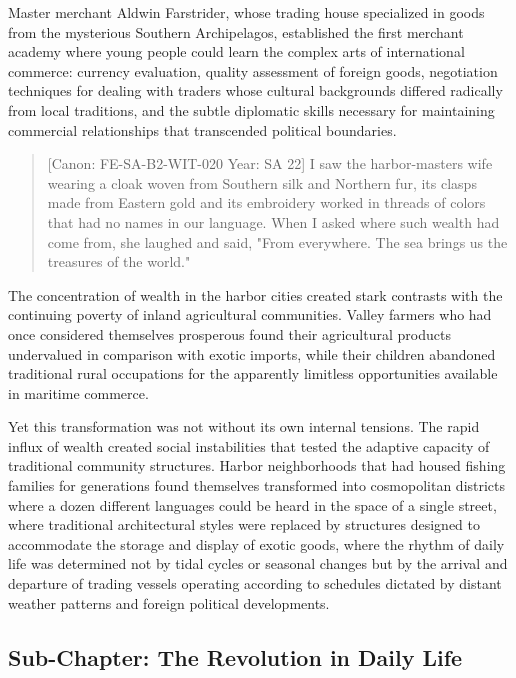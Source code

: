 Master merchant Aldwin Farstrider, whose trading house specialized in
goods from the mysterious Southern Archipelagos, established the first
merchant academy where young people could learn the complex arts of
international commerce: currency evaluation, quality assessment of
foreign goods, negotiation techniques for dealing with traders whose
cultural backgrounds differed radically from local traditions, and the
subtle diplomatic skills necessary for maintaining commercial
relationships that transcended political boundaries.

\begin{quote}
{[}Canon: FE-SA-B2-WIT-020 \textbar{} Year: SA 22{]} I saw the
harbor-master\textquotesingle s wife wearing a cloak woven from Southern
silk and Northern fur, its clasps made from Eastern gold and its
embroidery worked in threads of colors that had no names in our
language. When I asked where such wealth had come from, she laughed and
said, "From everywhere. The sea brings us the treasures of the world."
\end{quote}

The concentration of wealth in the harbor cities created stark contrasts
with the continuing poverty of inland agricultural communities. Valley
farmers who had once considered themselves prosperous found their
agricultural products undervalued in comparison with exotic imports,
while their children abandoned traditional rural occupations for the
apparently limitless opportunities available in maritime commerce.

Yet this transformation was not without its own internal tensions. The
rapid influx of wealth created social instabilities that tested the
adaptive capacity of traditional community structures. Harbor
neighborhoods that had housed fishing families for generations found
themselves transformed into cosmopolitan districts where a dozen
different languages could be heard in the space of a single street,
where traditional architectural styles were replaced by structures
designed to accommodate the storage and display of exotic goods, where
the rhythm of daily life was determined not by tidal cycles or seasonal
changes but by the arrival and departure of trading vessels operating
according to schedules dictated by distant weather patterns and foreign
political developments.

\subsection{Sub-Chapter: The Revolution in Daily
Life}\label{sub-chapter-the-revolution-in-daily-life}

